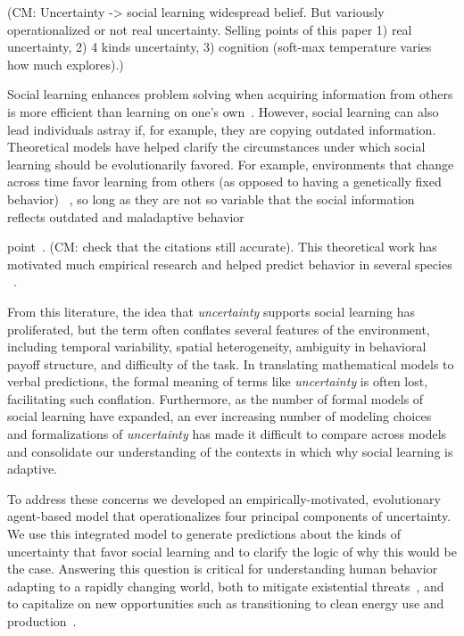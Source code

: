 \documentclass[letterpaper,11.5pt]{scrartcl}
\newcommand{\cm}[1]{{\textcolor{mypurple} {({\tiny CM:} #1)}}}
\begin{document}
\cm{Uncertainty -> social learning widespread belief. But variously operationalized or not real uncertainty. Selling points of this paper 1) real uncertainty, 2) 4 kinds uncertainty, 3) cognition (soft-max temperature varies how much explores).}

Social learning enhances problem solving when acquiring information from others is more efficient than learning on one's own~\cite{Laland2004}. However, social learning can also lead individuals astray if, for example, they are copying outdated information. Theoretical models have helped clarify the circumstances under which social learning should be evolutionarily favored. For example, environments that change across time favor learning from others (as opposed to having a genetically fixed behavior) ~\cite{BoydRicherson1985,Henrich1998}, so long as they are not so variable that the social information reflects outdated and maladaptive behavior

point~\cite{Rogers1988,Feldman1996}. \cm{check that the citations still accurate}. This theoretical work has motivated much empirical research and helped predict behavior in several species ~\cite{McElreath2005,Kendal2018,Allen2019}. 

From this literature, the idea that \emph{uncertainty} supports social learning has proliferated, but the term often conflates several features of the environment, including temporal variability,
spatial heterogeneity, ambiguity in behavioral payoff structure, and difficulty of the task.  In translating mathematical models to verbal predictions, the formal meaning of terms like \emph{uncertainty} is often lost, facilitating such conflation. Furthermore, as the number of formal models of social learning have expanded, an ever increasing number
of modeling choices ~\cite[Figure 1]{Kendal2018} and formalizations of \emph{uncertainty} has made it difficult to compare across models and consolidate our understanding of the contexts in which why social learning is adaptive.  

To address these concerns we developed an empirically-motivated, evolutionary agent-based model that operationalizes four principal components of uncertainty. We use this integrated model to generate predictions about the kinds of uncertainty that favor social learning and to clarify the logic of why this would be the case. Answering this question is critical for understanding human behavior adapting to a rapidly changing world, both to mitigate existential threats~\cite{Moya2020,Jones2021}, and to capitalize on new opportunities such as transitioning to clean energy use and production~\cite{NatureEnergyEditorialPromisesPremises2018,Brisbois2022}.
\end{document}
